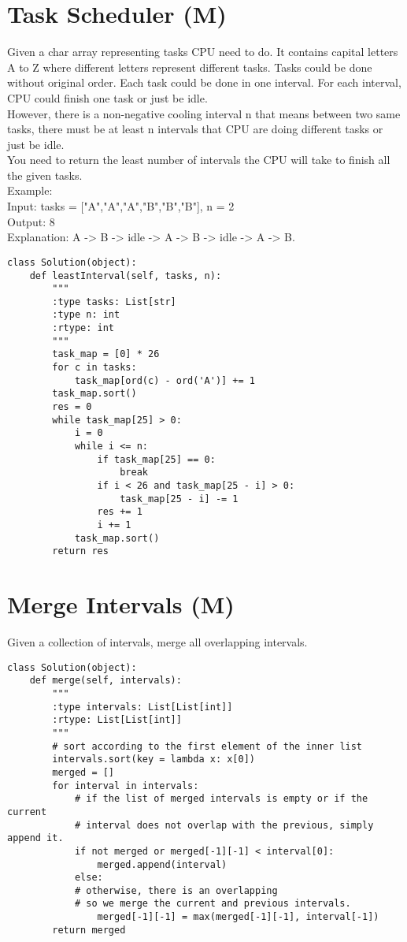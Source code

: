 \section{Task Scheduler (M)}
Given a char array representing tasks CPU need to do. It contains capital letters A to Z where different letters represent different tasks. Tasks could be done without original order. Each task could be done in one interval. For each interval, CPU could finish one task or just be idle.\\

However, there is a non-negative cooling interval n that means between two same tasks, there must be at least n intervals that CPU are doing different tasks or just be idle.\\

You need to return the least number of intervals the CPU will take to finish all the given tasks.\\

Example:\\
Input: tasks = ["A","A","A","B","B","B"], n = 2\\
Output: 8\\
Explanation: A -> B -> idle -> A -> B -> idle -> A -> B.\\

\begin{lstlisting}
class Solution(object):
    def leastInterval(self, tasks, n):
        """
        :type tasks: List[str]
        :type n: int
        :rtype: int
        """
        task_map = [0] * 26
        for c in tasks:
            task_map[ord(c) - ord('A')] += 1
        task_map.sort()
        res = 0
        while task_map[25] > 0:
            i = 0
            while i <= n:
                if task_map[25] == 0:
                    break
                if i < 26 and task_map[25 - i] > 0:
                    task_map[25 - i] -= 1
                res += 1
                i += 1
            task_map.sort()
        return res
\end{lstlisting}

\section{Merge Intervals (M)}
Given a collection of intervals, merge all overlapping intervals.

\begin{lstlisting}
class Solution(object):
    def merge(self, intervals):
        """
        :type intervals: List[List[int]]
        :rtype: List[List[int]]
        """
        # sort according to the first element of the inner list
        intervals.sort(key = lambda x: x[0])
        merged = []
        for interval in intervals:
            # if the list of merged intervals is empty or if the current
            # interval does not overlap with the previous, simply append it.
            if not merged or merged[-1][-1] < interval[0]:
                merged.append(interval)
            else:
            # otherwise, there is an overlapping
            # so we merge the current and previous intervals.
                merged[-1][-1] = max(merged[-1][-1], interval[-1])
        return merged        
\end{lstlisting}


